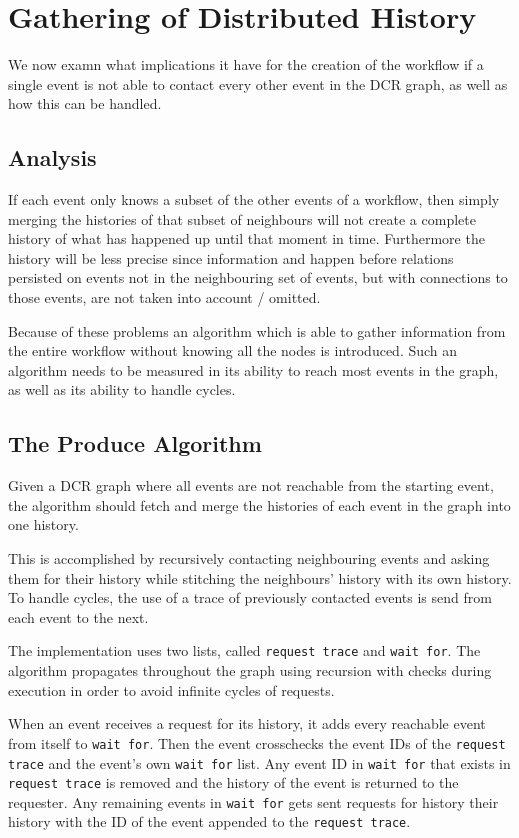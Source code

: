 \chapter{Gathering of Distributed History}
	We now examn what implications it have for the creation of the workflow if a single event is not able to contact every other event in the DCR graph, as well as how this can be handled.
	
	\section{Analysis}
	If each event only knows a subset of the other events of a workflow, then simply merging the histories of that subset of neighbours will not create a complete history of what has happened up until that moment in time. Furthermore the history will be less precise since information and happen before relations persisted on events not in the neighbouring set of events, but with connections to those events, are not taken into account / omitted.
	
	Because of these problems an algorithm which is able to gather information from the entire workflow without knowing all the nodes is introduced. Such an algorithm needs to be measured in its ability to reach most events in the graph, as well as its ability to handle cycles. 
	
	\section{The Produce Algorithm}
	Given a DCR graph where all events are not reachable from the starting event, the algorithm should fetch and merge the histories of each event in the graph into one history.
	
	This is accomplished by recursively contacting neighbouring events and asking them for their history while stitching the neighbours' history with its own history. To handle cycles, the use of a trace of previously contacted events is send from each event to the next.
	
	\newpar The implementation uses two lists, called \texttt{request trace} and \texttt{wait for}.
	The algorithm propagates throughout the graph using recursion with checks during execution in order to avoid infinite cycles of requests. 
	
	When an event receives a request for its history, it adds every reachable event from itself to \texttt{wait for}. Then the event crosschecks the event IDs of the \texttt{request trace} and the event's own \texttt{wait for} list. Any event ID in \texttt{wait for} that exists in \texttt{request trace} is removed and the history of the event is returned to the requester. Any remaining events in \texttt{wait for} gets sent requests for history their history with the ID of the event appended to the \texttt{request trace}. 
	

